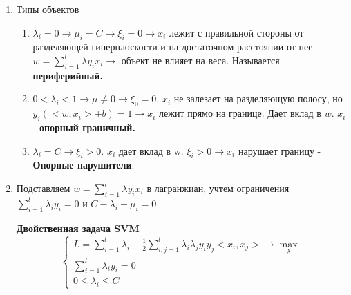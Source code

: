 \documentclass[a4paper, 12pt]{article}
\begin{document}
\begin{enumerate}
\begin{enumerate}
        \item Типы объектов
        \begin{enumerate}
            \item $\lambda_i = 0 \rightarrow \mu_i = C \rightarrow \xi_i = 0 \rightarrow x_i$ лежит с правильной стороны от 
            разделяющей гиперплоскости и на достаточном расстоянии от нее. $w = \sum_{i = 1}^l \lambda y_i x_i \rightarrow$ объект не влияет на веса. 
            Называется \textbf{периферийный.}
            \item $0 < \lambda_i < 1 \rightarrow \mu \neq 0 \rightarrow \xi_0 = 0$. $x_i$ не залезает на разделяющую полосу, но $y_i(<w, x_i> + b) = 1 \rightarrow x_i$ лежит прямо на границе.
            Дает вклад в $w$. $x_i$ - \textbf{опорный граничный.}
            \item $\lambda_i = C \rightarrow \xi_i > 0$. 
            $x_i$ дает вклад в w. $\xi_i > 0 \rightarrow x_i$ нарушает границу - \textbf{Опорные нарушители}.      
        \end{enumerate}
        \item Подставляем $w = \sum_{i = 1}^l \lambda y_i x_i$ в лагранжиан, учтем ограничения $\sum_{i = 1}^l \lambda_i y_i = 0$ и $C - \lambda_i - \mu_i = 0$
        
        \textbf{Двойственная задача SVM}
        \[\begin{cases}
            L = \sum_{i = 1}^l \lambda_i - \frac{1}{2}\sum_{i, j = 1}^l \lambda_i \lambda_j y_i y_j <x_i, x_j> \rightarrow \max_{\lambda} \\
            \sum_{i = 1}^l \lambda_i y_i = 0 \\
            0 \leq \lambda_i \leq C
        \end{cases}\]


\end{enumerate}
\end{enumerate}
\end{document}
